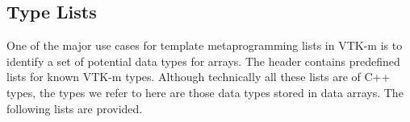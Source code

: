 
\subsection{Type Lists}
\label{sec:TypeLists}


One of the major use cases for template metaprogramming lists in VTK-m is
to identify a set of potential data types for arrays. The
 header contains predefined lists for known
VTK-m types. Although technically all these lists are of C++ types, the
types we refer to here are those data types stored in data arrays. The
following lists are provided.

